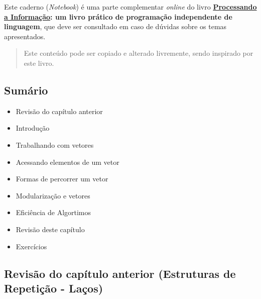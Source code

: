 \documentclass[12pt,a4paper]{article}
\providecommand{\tightlist}{%
      \setlength{\itemsep}{0pt}\setlength{\parskip}{0pt}}
\begin{document}
Este caderno (\emph{Notebook}) é uma parte complementar \emph{online} do
livro
\textbf{\href{https://editora.ufabc.edu.br/matematica-e-ciencias-da-computacao/58-processando-a-informacao}{Processando
a Informação}: um livro prático de programação independente de
linguagem}, que deve ser consultado em caso de dúvidas sobre os temas
apresentados.

\begin{quote}
Este conteúdo pode ser copiado e alterado livremente, sendo inspirado
por este livro.
\end{quote}

    \hypertarget{sumuxe1rio}{%
\subsection{Sumário}\label{sumuxe1rio}}

\begin{itemize}
\tightlist
\item
  Revisão do capítulo anterior
\item
  Introdução
\item
  Trabalhando com vetores
\item
  Acessando elementos de um vetor
\item
  Formas de percorrer um vetor
\item
  Modularização e vetores
\item
  Eficiência de Algortimos
\item
  Revisão deste capítulo
\item
  Exercícios
\end{itemize}

    \hypertarget{revisuxe3o-do-capuxedtulo-anterior-estruturas-de-repetiuxe7uxe3o---lauxe7os}{%
\subsection{Revisão do capítulo anterior (Estruturas de Repetição -
Laços)}\label{revisuxe3o-do-capuxedtulo-anterior-estruturas-de-repetiuxe7uxe3o---lauxe7os}}
\end{document}
